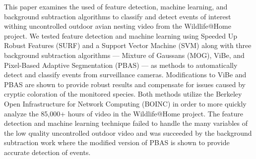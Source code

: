 This paper examines the used of feature detection, machine learning, and background subtraction algorithms to classify and detect events of interest withing uncontrolled outdoor avian nesting video from the Wildlife@Home project. We tested feature detection and machine learning using Speeded Up Robust Features (SURF) and a Support Vector Machine (SVM) along with three background subtraction algorithms --- Mixture of Gaussans (MOG), ViBe, and Pixel-Based Adaptive Segmentation (PBAS) --- as methods to automatically detect and classify events from surveillance cameras. Modifications to ViBe and PBAS are shown to provide robust results and compensate for issues caused by cryptic coloration of the monitored species. Both methods utilize the Berkeley Open Infrastructure for Network Computing (BOINC) in order to more quickly analyze the 85,000+ hours of video in the Wildlife@Home project. The feature detection and machine learning technique failed to handle the many variables of the low quality uncontrolled outdoor video and was succeeded by the background subtraction work where the modified version of PBAS is shown to provide accurate detection of events.

